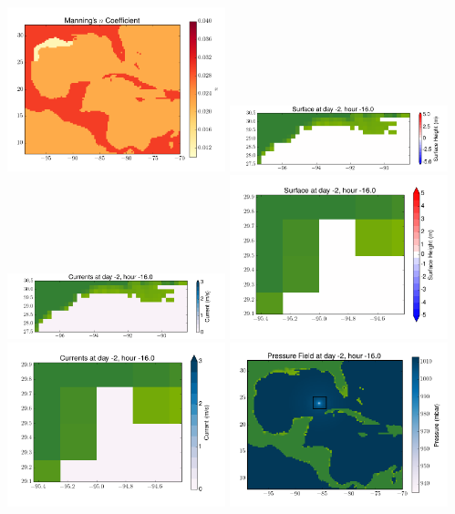 \documentclass[11pt]{article}
\begin{document}
\vskip 10pt 
\includegraphics[width=0.475\textwidth]{frame0008fig3.png}
\includegraphics[width=0.475\textwidth]{frame0008fig4.png}
\vskip 10pt 
\includegraphics[width=0.475\textwidth]{frame0008fig5.png}
\includegraphics[width=0.475\textwidth]{frame0008fig6.png}
\vskip 10pt 
\includegraphics[width=0.475\textwidth]{frame0008fig7.png}
\includegraphics[width=0.475\textwidth]{frame0008fig8.png}
\end{document}
